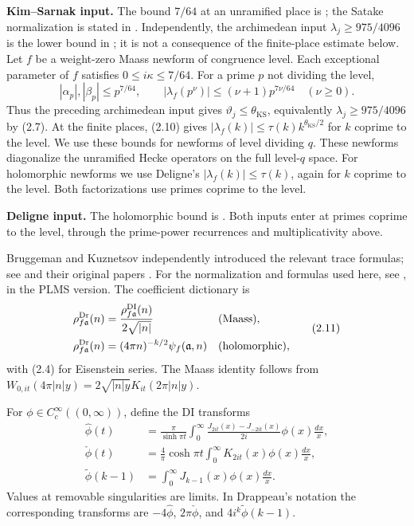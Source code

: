 \textbf{Kim--Sarnak input.} The bound $7/64$ at an unramified place is \cite[Appendix~2, Proposition~2]{KS03}; the Satake normalization is stated in \cite[p.~175]{KS03}. Independently, the archimedean input
$\lambda_j\geq975/4096$ is the lower bound in \cite[Appendix~2]{KS03}; it is not a consequence of the finite-place estimate below. Let $f$ be a weight-zero Maass newform of congruence level. Each exceptional parameter of $f$ satisfies $0\leq i\kappa\leq7/64$. For a prime $p$ not dividing the level,
\[
 |\alpha_p|,|\beta_p|\leq p^{7/64},\qquad
 |\lambda_f(p^\nu)|\leq(\nu+1)p^{7\nu/64}
 \quad(\nu\geq0).
\tag{2.10}\label{p1:eq:2.10}
\]
Thus the preceding archimedean input gives $\vartheta_j\leq\theta_{\mathrm{KS}}$, equivalently $\lambda_j\geq975/4096$ by (2.7). At the finite places, (2.10) gives $|\lambda_f(k)|\leq\tau(k)k^{\theta_{\mathrm{KS}}/2}$ for $k$ coprime to the level. We use these bounds for newforms of level dividing $q$. These newforms diagonalize the unramified Hecke operators on the full level-$q$ space. For holomorphic newforms we use Deligne's $ |\lambda_f(k)|\leq\tau(k)$, again for $k$ coprime to the level. Both factorizations use primes coprime to the level.

\textbf{Deligne input.} The holomorphic bound is \cite[Th\'eor\`eme~8.2]{Deligne74}. Both inputs enter at primes coprime to the level, through the prime-power recurrences and multiplicativity above.

Bruggeman and Kuznetsov independently introduced the relevant trace
formulas; see \cite[p.~220]{DI82} and their original papers
\cite{Bruggeman78,Kuznetsov81}. For the normalization and formulas used
here, see \cite[(4.7), (4.9)--(4.19), Lemma~4.5]{Drappeau}, in the PLMS version.
The coefficient dictionary is
\[
\begin{aligned}
 \rho^{\rm Dr}_{f\mathfrak a}(n)&=\frac{\rho^{\rm DI}_{f\mathfrak a}(n)}{2\sqrt{|n|}}
 &&\hbox{(Maass)},\\
 \rho^{\rm Dr}_{f\mathfrak a}(n)&=(4\pi n)^{-k/2}\psi_f(\mathfrak a,n)
 &&\hbox{(holomorphic)},
\end{aligned}
\tag{2.11}\label{p1:eq:2.11}
\]
with (2.4) for Eisenstein series. The Maass identity follows from $W_{0,it}(4\pi|n|y)=2\sqrt{|n|y}K_{it}(2\pi|n|y)$.

For $\phi\in C_c^\infty((0,\infty))$, define the DI transforms
\[
\begin{split}
 \widehat\phi(t)&=\frac\pi{\sinh\pi t}
 \int_0^\infty\frac{J_{2it}(x)-J_{-2it}(x)}{2i}\phi(x)\frac{dx}x,\\
 \check\phi(t)&=\frac4\pi\cosh\pi t
 \int_0^\infty K_{2it}(x)\phi(x)\frac{dx}x,\\
 \widetilde\phi(k-1)&=\int_0^\infty J_{k-1}(x)\phi(x)\frac{dx}x.
\end{split}
\tag{2.12}\label{p1:eq:2.12}
\]
Values at removable singularities are limits. In Drappeau's notation the corresponding transforms are $-4\widehat\phi$, $2\pi\check\phi$, and $4i^k\widetilde\phi(k-1)$.


